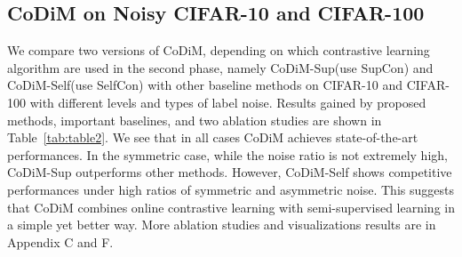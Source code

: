 \documentclass[letterpaper]{article} \usepackage{aaai22}  \usepackage{times}  \usepackage{helvet}  \usepackage{courier}  \usepackage[hyphens]{url}  \usepackage{graphicx} \usepackage{subfigure}
\begin{document}
\subsection{CoDiM on Noisy CIFAR-10 and CIFAR-100}
We compare two versions of CoDiM, depending on which contrastive learning algorithm are used in the second phase, namely CoDiM-Sup(use SupCon) and CoDiM-Self(use SelfCon) with other baseline methods on CIFAR-10 and CIFAR-100 with different levels and types of label noise. Results gained by proposed methods, important baselines, and two ablation studies are shown in Table~\ref{tab:table2}. We see that in all cases CoDiM achieves state-of-the-art performances. In the symmetric case, while the noise ratio is not extremely high, CoDiM-Sup outperforms other methods. However, CoDiM-Self shows competitive performances under high ratios of symmetric and asymmetric noise. This suggests that CoDiM combines online contrastive learning with semi-supervised learning in a simple yet better way. More ablation studies and visualizations results are in Appendix C and F.   
\end{document}
